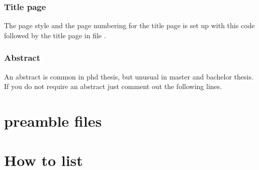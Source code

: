 \subsection{Title page}
The page style and the page numbering for the title page is set up with this code
%
followed by the title page in file .

\subsection{Abstract}
An abstract is common in phd thesis, but unusual in master and bachelor thesis. If you do not require an abstract just comment out the following lines.


\chapter{preamble files}

\chapter{How to list}